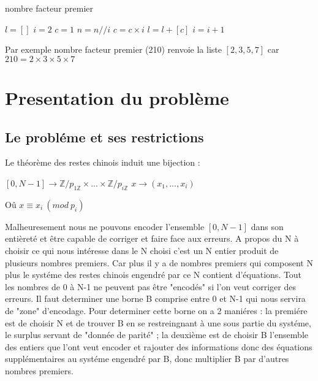 \documentclass[a4paper, 11pt]{report}
\begin{document}
\begin{algorithm}
    \caption{nombre facteur premier}
    \begin{algorithmic}
        \STATE $l=[]$
        \STATE $i=2$
        \STATE $c=1$
        \STATE $n=n//i$
        \STATE $c=c\times i$
        \ENDWHILE
        \STATE $l=l+\left[c\right] $
        \ENDIF
        \STATE $i=i+1$
        \ENDWHILE
    \end{algorithmic}
\end{algorithm}

Par exemple nombre facteur premier (210) renvoie la liste $[2,3,5,7]$ car $210=2\times 3\times 5\times 7$

\newpage
\chapter{Presentation du problème}
\section{Le probléme et ses restrictions}
Le théorème des restes chinois induit une bijection :
\newline
\begin{center}
  

$[0,N-1] \rightarrow \mathbb{Z}/ p_{1 \mathbb{Z}} \times  ... \times   \mathbb{Z}/ p_{i \mathbb{Z}} $  \newline
$x \rightarrow (x_1,...,x_i) $ 

\end{center}
\newline
\newline

Oû $ x\equiv x_i \: (mod \: p_i)$
\newline

Malheuresement nous ne pouvons encoder l'ensemble $[0,N-1]$ dans son entièreté et être capable de corriger et faire face aux erreurs.\newline
A  propos du N à choisir ce qui nous intéresse dans le N choisi c'est un N entier produit de plusieurs nombres premiers.\newline 
Car plus il y a de nombres premiers qui composent N plus le systéme des restes chinois engendré par ce N contient d'équations.  \newline
Tout les nombres de 0 à N-1 ne peuvent pas être "encodés" si l'on veut corriger des erreurs.\newline
Il faut determiner une borne B comprise entre 0 et N-1 qui nous servira de "zone" d'encodage.\newline
Pour determiner cette borne on a 2 maniéres :\newline
la premiére est de choisir N et de trouver B en se restreingnant à une sous partie du systéme, le surplus servant de "donnée de parité" ;\newline
la deuxième est de choisir B l'ensemble des entiers que l'ont veut encoder et rajouter des informations donc des équations supplémentaires au systéme engendré par B, donc multiplier B par d'autres nombres premiers.\newline
\end{document}
